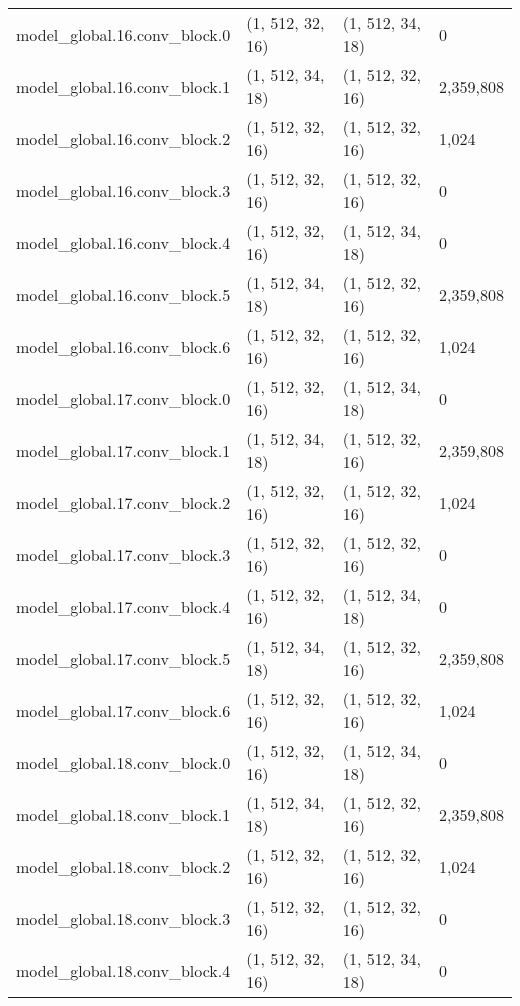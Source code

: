 \begin{longtable}{llll}
        model\_global.16.conv\_block.0 &   (1, 512, 32, 16) &   (1, 512, 34, 18) &           0 \\
        model\_global.16.conv\_block.1 &   (1, 512, 34, 18) &   (1, 512, 32, 16) &   2,359,808 \\
        model\_global.16.conv\_block.2 &   (1, 512, 32, 16) &   (1, 512, 32, 16) &       1,024 \\
        model\_global.16.conv\_block.3 &   (1, 512, 32, 16) &   (1, 512, 32, 16) &           0 \\
        model\_global.16.conv\_block.4 &   (1, 512, 32, 16) &   (1, 512, 34, 18) &           0 \\
        model\_global.16.conv\_block.5 &   (1, 512, 34, 18) &   (1, 512, 32, 16) &   2,359,808 \\
        model\_global.16.conv\_block.6 &   (1, 512, 32, 16) &   (1, 512, 32, 16) &       1,024 \\
        model\_global.17.conv\_block.0 &   (1, 512, 32, 16) &   (1, 512, 34, 18) &           0 \\
        model\_global.17.conv\_block.1 &   (1, 512, 34, 18) &   (1, 512, 32, 16) &   2,359,808 \\
        model\_global.17.conv\_block.2 &   (1, 512, 32, 16) &   (1, 512, 32, 16) &       1,024 \\
        model\_global.17.conv\_block.3 &   (1, 512, 32, 16) &   (1, 512, 32, 16) &           0 \\
        model\_global.17.conv\_block.4 &   (1, 512, 32, 16) &   (1, 512, 34, 18) &           0 \\
        model\_global.17.conv\_block.5 &   (1, 512, 34, 18) &   (1, 512, 32, 16) &   2,359,808 \\
        model\_global.17.conv\_block.6 &   (1, 512, 32, 16) &   (1, 512, 32, 16) &       1,024 \\
        model\_global.18.conv\_block.0 &   (1, 512, 32, 16) &   (1, 512, 34, 18) &           0 \\
        model\_global.18.conv\_block.1 &   (1, 512, 34, 18) &   (1, 512, 32, 16) &   2,359,808 \\
        model\_global.18.conv\_block.2 &   (1, 512, 32, 16) &   (1, 512, 32, 16) &       1,024 \\
        model\_global.18.conv\_block.3 &   (1, 512, 32, 16) &   (1, 512, 32, 16) &           0 \\
        model\_global.18.conv\_block.4 &   (1, 512, 32, 16) &   (1, 512, 34, 18) &           0 \\

\end{longtable}
